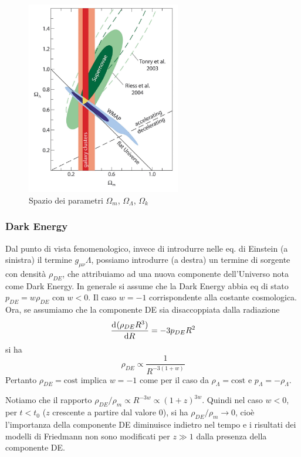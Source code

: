 \begin{figure}
  \centering{}
  \includegraphics[width=0.6\textwidth]{figure/Cosmological_parameters.pdf}
  \caption{Spazio dei parametri $\Omega_{m}$, $\Omega_{\Lambda}$, $\Omega_k$}
  \label{fig:Par_Cosm}
\end{figure}

\subsubsection{Dark Energy}

Dal punto di vista fenomenologico, invece di introdurre nelle eq. di Einstein (a
sinistra) il termine $g_{\mu \nu}\Lambda$, possiamo introdurre (a destra) un
termine di sorgente con densità $\rho_{DE}$, che attribuiamo ad una nuova
componente dell'Universo nota come Dark Energy.  In generale si assume che la
Dark Energy abbia eq di stato $p_{DE}=w\rho_{DE}$ con $w<0$.  Il caso $w=-1$
corrispondente alla costante cosmologica.  Ora, se assumiamo che la componente
DE sia disaccoppiata dalla radiazione
\begin{equation}
  \frac{{\mathop{}\!\mathrm{d}^{}}(\rho_{DE} R^3)}{\mathop{}\!\mathrm{d} {R}^{}} = -3 p_{DE} R^2
\end{equation}
si ha
\begin{equation}
  \rho_{DE} \propto \frac {1}{R^{-3(1+w)}}
\end{equation}
Pertanto $\rho_{DE}=\text{cost}$ implica $w=-1$ come per il caso
da $\rho_{\Lambda}=\text{cost}$ e $p_{\Lambda}=-\rho_{\Lambda}$.

Notiamo che il rapporto $\rho_{DE}/\rho_m \propto R^{-3w} \propto (1+z)^{3w}$.
Quindi nel caso $w<0$, per $t < t_0 $ ($z$ crescente a partire dal valore 0), si
ha $\rho_{DE}/\rho_m \to 0$, cioè l'importanza della componente DE diminuisce
indietro nel tempo e i risultati dei modelli di Friedmann non sono modificati
per $z\gg 1$ dalla presenza della componente DE.


